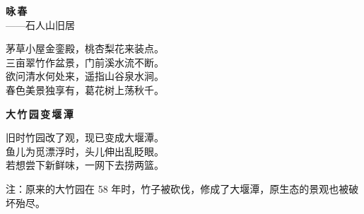 \vspace{1.2em}

\begin{center}
{\trueka\bfseries\large 咏\,春}\\[1pt]
{\trueka\small\color{inkgray} ——石人山旧居}
\end{center}

\begin{center}\trueka
茅草小屋金銮殿，桃杏梨花来装点。\\
三亩翠竹作盆景，门前溪水流不断。\\
欲问清水何处来，遥指山谷泉水涧。\\
春色美景独享有，葛花树上荡秋千。
\end{center}

\vspace{1.2em}

\begin{center}
{\trueka\bfseries\large 大\,竹\,园\,变\,堰\,潭}
\end{center}

\begin{center}\trueka
旧时竹园改了观，现已变成大堰潭。\\
鱼儿为觅漂浮时，头儿伸出乱眨眼。\\
若想尝下新鲜味，一网下去捞两篮。
\end{center}

\vspace{0.3em}
\begin{center}
{\footnotesize\color{inkgray}注：原来的大竹园在 58 年时，竹子被砍伐，修成了大堰潭，原生态的景观也被破坏殆尽。}
\end{center}
